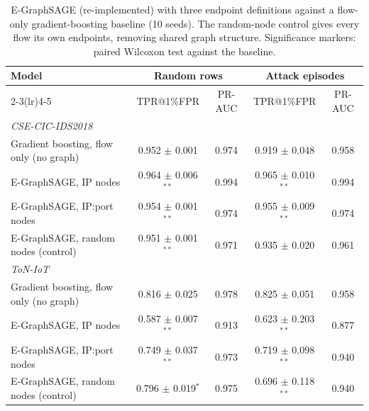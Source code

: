 \begin{table}[t]
\centering
\footnotesize
\caption{E-GraphSAGE (re-implemented) with three endpoint definitions against a flow-only gradient-boosting baseline (10 seeds). The random-node control gives every flow its own endpoints, removing shared graph structure. Significance markers: paired Wilcoxon test against the baseline.}
\label{tab:egraphsage}
\begin{tabular}{lcccc}
\toprule
Model & \multicolumn{2}{c}{Random rows} & \multicolumn{2}{c}{Attack episodes} \\
\cmidrule(lr){2-3}\cmidrule(lr){4-5}
 & TPR@1\%FPR & PR-AUC & TPR@1\%FPR & PR-AUC \\
\midrule
\multicolumn{5}{l}{\textit{CSE-CIC-IDS2018}} \\
\quad Gradient boosting, flow only (no graph) & 0.952 $\pm$ 0.001 & 0.974 & 0.919 $\pm$ 0.048 & 0.958 \\
\quad E-GraphSAGE, IP nodes & 0.964 $\pm$ 0.006$^{**}$ & 0.994 & 0.965 $\pm$ 0.010$^{**}$ & 0.994 \\
\quad E-GraphSAGE, IP:port nodes & 0.954 $\pm$ 0.001$^{**}$ & 0.974 & 0.955 $\pm$ 0.009$^{**}$ & 0.974 \\
\quad E-GraphSAGE, random nodes (control) & 0.951 $\pm$ 0.001$^{**}$ & 0.971 & 0.935 $\pm$ 0.020 & 0.961 \\
\multicolumn{5}{l}{\textit{ToN-IoT}} \\
\quad Gradient boosting, flow only (no graph) & 0.816 $\pm$ 0.025 & 0.978 & 0.825 $\pm$ 0.051 & 0.958 \\
\quad E-GraphSAGE, IP nodes & 0.587 $\pm$ 0.007$^{**}$ & 0.913 & 0.623 $\pm$ 0.203$^{**}$ & 0.877 \\
\quad E-GraphSAGE, IP:port nodes & 0.749 $\pm$ 0.037$^{**}$ & 0.973 & 0.719 $\pm$ 0.098$^{**}$ & 0.940 \\
\quad E-GraphSAGE, random nodes (control) & 0.796 $\pm$ 0.019$^{*}$ & 0.975 & 0.696 $\pm$ 0.118$^{**}$ & 0.940 \\
\bottomrule
\end{tabular}
\end{table}
